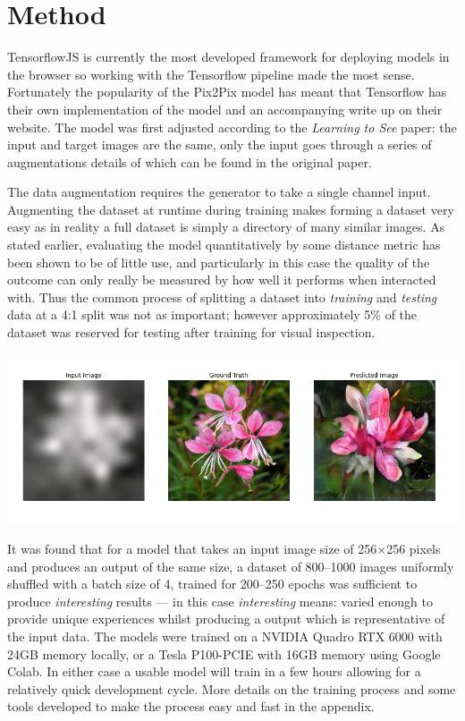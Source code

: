 \documentclass[a4paper]{article}
\begin{document}
\section{Method}
TensorflowJS is currently the most developed framework for deploying models in the browser so working with the Tensorflow pipeline made the most sense. Fortunately the popularity of the Pix2Pix model has meant that Tensorflow has their own implementation of the model and an accompanying write up on their website\cite{tf_p2p}. The model was first adjusted according to the \textit{Learning to See} paper\cite{2003.00902}: the input and target images are the same, only the input goes through a series of augmentations details of which can be found in the original paper\cite{2003.00902}.

The data augmentation requires the generator to take a single channel input. Augmenting the dataset at runtime during training makes forming a dataset very easy as in reality a full dataset is simply a directory of many similar images. As stated earlier, evaluating the model quantitatively by some distance metric has been shown to be of little use, and particularly in this case the quality of the outcome can only really be measured by how well it performs when interacted with. Thus the common process of splitting a dataset into \textit{training} and \textit{testing} data at a 4:1 split was not as important; however approximately 5\% of the dataset was reserved for testing after training for visual inspection.

\includegraphics[width=\textwidth]{250_epochs}

It was found that for a model that takes an input image size of 256$\times$256 pixels and produces an output of the same size, a dataset of 800--1000 images uniformly shuffled with a batch size of 4, trained for 200--250 epochs was sufficient to produce \textit{interesting} results --- in this case \textit{interesting} means: varied enough to provide unique experiences whilst producing a output which is representative of the input data. The models were trained on a NVIDIA Quadro RTX 6000 with 24GB memory locally, or a Tesla P100-PCIE with 16GB memory using Google Colab. In either case a usable model will train in a few hours allowing for a relatively quick development cycle. More details on the training process and some tools developed to make the process easy and fast in the appendix.
\end{document}
